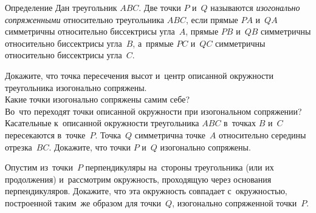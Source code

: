


\begin{claim}{Определение}
Дан треугольник $ABC$.
Две точки $P$ и~$Q$ называются \emph{изогонально сопряженными} относительно
треугольника $ABC$, если
прямые $PA$ и~$QA$ симметричны относительно биссектрисы угла~$A$,
прямые $PB$ и~$QB$ симметричны относительно биссектрисы угла~$B$,
а~прямые $PC$ и~$QC$ симметричны относительно биссектрисы угла~$C$.
\end{claim}

\begin{problems}

\item
\subproblem
Докажите, что точка пересечения высот и~центр описанной окружности треугольника
изогонально сопряжены.
\\
\subproblem
Какие точки изогонально сопряжены самим себе?
\\
\subproblem
Во~что переходят точки описанной окружности при изогональном сопряжении?
\\
\subproblem
Касательные к~описанной окружности треугольника $ABC$ в~точках $B$ и~$C$
пересекаются в~точке~$P$.
Точка~$Q$ симметрична точке~$A$ относительно середины отрезка~$BC$.
Докажите, что точки $P$ и~$Q$ изогонально сопряжены.

\item
Опустим из~точки~$P$ перпендикуляры на~стороны треугольника
(или их продолжения) и~рассмотрим окружность, проходящую через основания
перпендикуляров.
Докажите, что эта окружность совпадает с~окружностью, построенной таким~же
образом для точки~$Q$, изогонально сопряженной точки~$P$.




\end{problems}
